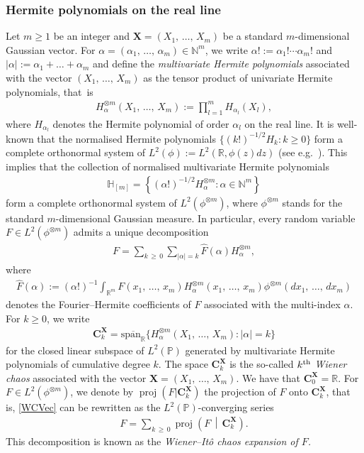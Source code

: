 \documentclass[AHL,Unicode,longabstracts,published]{cedram}
\DeclareMathOperator{\proj}{proj}
\newcommand{\spanl}{\mathrm{span}}
\newcommand{\bfX}{\mathbf{X}}
\newcommand{\bfC}{\mathbf{C}}
\newcommand{\R}{\mathbb{R}}
\newcommand{\N}{\mathbb{N}}
\newcommand{\bbH}{\mathbb{H}}
\newcommand{\Prob}{\mathbb{P}}
\begin{document}
\subsubsection{Hermite polynomials on the real line}
Let $m\geq 1$ be an integer and $\bfX=(X_1,\,\ldots,\,X_m)$ be a standard $m$-dimensional Gaussian vector. For $\alpha=(\alpha_1,\,\ldots,\,\alpha_m) \in \N^m$, we write $\alpha!:= \alpha_1!\cdots \alpha_m!$ and $|\alpha|:= \alpha_1+\ldots + \alpha_m$ and define the \emph{multivariate Hermite polynomials} associated with the vector $(X_1,\,\ldots,\,X_m)$ as the tensor product of univariate Hermite polynomials, that~is
\begin{gather*}
H^{\otimes m}_{\alpha}(X_1,\,\ldots,\,X_m):= \prod_{l=1}^{m} H_{{\alpha}_l}(X_l),
\end{gather*}
where $H_{\alpha_l}$ denotes the Hermite polynomial of order $\alpha_l$ on the real line. It is well-known that the normalised Hermite polynomials $\{(k!)^{-1/2}H_k: k \geq 0\}$ form a complete orthonormal system of $L^2(\phi):=L^2(\R,\phi(z)dz)$ (see e.g.~\cite{NP12}). This implies that the collection of normalised multivariate Hermite polynomials
\begin{gather}\label{Hm}
\bbH_{[m]}=\left\{ (\alpha!)^{-1/2} H^{\otimes m}_{\alpha} : \alpha \in \N^m \right\}
\end{gather}
form a complete orthonormal system of $L^2(\phi^{\otimes m})$, where $\phi^{\otimes m}$ stands for the standard $m$-dimensional Gaussian measure. In particular, every random variable $F \in L^2(\phi^{\otimes m})$ admits a unique decomposition
\begin{gather}\label{WCVec}
F = \sum_{k\,\geq\,0} \sum_{|\alpha|=k} \widehat{F}(\alpha) H^{\otimes m}_{\alpha},
\end{gather}
where
\begin{gather}\label{CoeffVec}
\widehat{F}(\alpha) := (\alpha!)^{-1} \int_{\R^m} F(x_1,\,\ldots,\,x_m) H^{\otimes m}_{\alpha}(x_1,\,\ldots,\,x_m) \phi^{\otimes m}(dx_1,\,\ldots,\,dx_m)
\end{gather}
denotes the Fourier--Hermite coefficients of $F$ associated with the multi-index $\alpha$. For $k\geq0$, we write
\begin{gather}\label{Ck}
\bfC_k^{\bfX} = \overline{\spanl_{\R}}\{ H_{\alpha}^{\otimes m}(X_1,\,\ldots,\,X_m): |\alpha|=k\}
\end{gather}
for the closed linear subspace of $L^2(\Prob)$ generated by multivariate Hermite polynomials of cumulative degree $k$. The space $\bfC_k^{\bfX}$ is the so-called \emph{$k^{\rm th}$ Wiener chaos} associated with the vector $\bfX=(X_1,\,\ldots,\,X_m)$. We have that $\bfC_0^{\bfX}=\R$. For $F \in L^2(\phi^{\otimes m})$, we denote by $\proj(F|\bfC_k^{\bfX})$ the projection of $F$ onto $\bfC_k^{\bfX}$, that is, \eqref{WCVec} can be rewritten as the $L^2(\Prob)$-converging series
\begin{gather*}
F = \sum_{k\,\geq\,0} \proj\left(F\,\middle|\, \bfC_k^{\bfX}\right).
\end{gather*}
This decomposition is known as the \emph{Wiener--Itô chaos expansion of $F$.}
\end{document}
